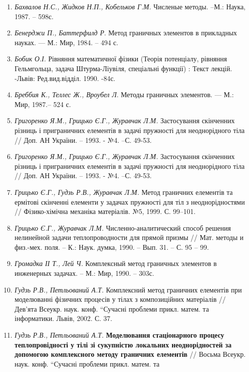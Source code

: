 \begin{enumerate}
\def\labelenumi{\arabic{enumi}.}
\item
  \emph{Бахвалов Н.С., Жидков Н.П., Кобельков Г.М.} Численые методы.
  --М.: Наука, 1987. -- 598с.
\item
  \emph{Бенерджи П., Баттерфилд Р}. Метод граничных элементов в
  прикладных науках. --- М.: Мир, 1984. -- 494 с.
\item
  \emph{Бобик О.І.} Рівняння математичної фізики (Теорія потенціалу,
  рівняння Гельмгольца, задача Штурма-Ліувіля, спеціальні функції) :
  Текст лекцій. -Львів: Ред.вид.відділ. 1990. -84с.
\item
  \emph{Бреббия К., Теллес Ж., Вроубел Л}. Методы граничных элементов.
  --- М.: Мир, 1987.-- 524 с.
\item
  \emph{Григоренко Я.М., Грицько Є.Г., Журавчак Л.М.} Застосування
  скінченних різниць і приграничних елементів в задачі пружності для
  неоднорідного тіла // Доп. АН України. -- 1993. - №4. --С. 49-53.
\item
  \emph{Григоренко Я.М., Грицько Є.Г., Журавчак Л.М.} Застосування
  скінченних різниць і приграничних елементів в задачі пружності для
  неоднорідного тіла // Доп. АН України. -- 1993. - №4. --С. 49-53.
\item
  \emph{Грицько Є.Г., Гудзь Р.В., Журавчак Л.М.} Метод граничних
  елементів та ермітові скінченні елементи у задачах пружності для тіл з
  неоднорідностями // Фізико-хімічна механіка матеріалів. №5, 1999. С.
  99--101.
\item
  \emph{Грицько Є.Г., Журавчак Л.М.} Численно-аналитический способ
  решения нелинейной задачи теплопроводности для прямой призмы // Мат.
  методы и физ.-мех. поля. -- К.: Наук. думка, 1990. -- Вып. 31. -- С.
  95 -- 99.
\item
  \emph{Громадка ІІ Т., Лей Ч.} Комплексный метод граничных элементов в
  инженерных задачах. -- М.: Мир, 1990. -- 303с.
\item
  \emph{Гудзь Р.В.,} \emph{Петльований А.Т.} Комплексний метод граничних
  елементів при моделюванні фізичних процесів у тілах з композиційних
  матеріалів // Дев'ята Всеукр. наук. конф. ``Сучасні проблеми прикл.
  матем. та інформатики. Львів, 2002. С. 37.
\item
  \emph{Гудзь Р.В.,} \emph{Петльований А.Т.} \textbf{Моделювання
  стаціонарного процесу теплопровідності у тілі зі сукупністю локальних
  неоднорідностей за допомогою комплексного методу граничних елементів}
  // Восьма Всеукр. наук. конф. ``Сучасні проблеми прикл. матем. та

\end{enumerate}
